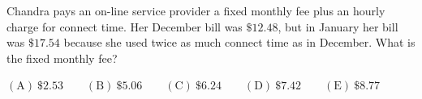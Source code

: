 Chandra pays an on-line service provider a fixed monthly fee plus an hourly charge for connect time. Her December bill was $\$12.48$, but in January her bill was $\$17.54$ because she used twice as much connect time as in December. What is the fixed monthly fee?

$\mathrm{(A)}\ \$2.53\qquad\mathrm{(B)}\ \$5.06\qquad\mathrm{(C)}\ \$6.24\qquad\mathrm{(D)}\ \$7.42\qquad\mathrm{(E)}\ \$8.77$
